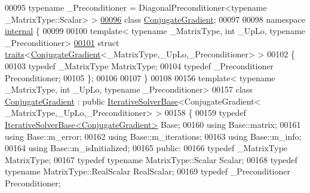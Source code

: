 \begin{DoxyCode}
00095           \textcolor{keyword}{typename} \_Preconditioner = DiagonalPreconditioner<typename \_MatrixType::Scalar> >
\hyperlink{group___iterative_linear_solvers___module}{00096} \textcolor{keyword}{class }\hyperlink{group___iterative_linear_solvers___module_class_eigen_1_1_conjugate_gradient}{ConjugateGradient};
00097 
00098 \textcolor{keyword}{namespace }\hyperlink{namespaceinternal}{internal} \{
00099 
00100 \textcolor{keyword}{template}< \textcolor{keyword}{typename} \_MatrixType, \textcolor{keywordtype}{int} \_UpLo, \textcolor{keyword}{typename} \_Preconditioner>
\hyperlink{struct_eigen_1_1internal_1_1traits_3_01_conjugate_gradient_3_01___matrix_type_00_01___up_lo_00_01___preconditioner_01_4_01_4}{00101} \textcolor{keyword}{struct }\hyperlink{struct_eigen_1_1internal_1_1traits}{traits}<\hyperlink{group___iterative_linear_solvers___module_class_eigen_1_1_conjugate_gradient}{ConjugateGradient}<\_MatrixType,\_UpLo,\_Preconditioner> >
00102 \{
00103   \textcolor{keyword}{typedef} \_MatrixType MatrixType;
00104   \textcolor{keyword}{typedef} \_Preconditioner Preconditioner;
00105 \};
00106 
00107 \}
00108 
00156 \textcolor{keyword}{template}< \textcolor{keyword}{typename} \_MatrixType, \textcolor{keywordtype}{int} \_UpLo, \textcolor{keyword}{typename} \_Preconditioner>
00157 \textcolor{keyword}{class }\hyperlink{group___iterative_linear_solvers___module_class_eigen_1_1_conjugate_gradient}{ConjugateGradient} : \textcolor{keyword}{public} \hyperlink{group___iterative_linear_solvers___module_class_eigen_1_1_iterative_solver_base}{IterativeSolverBase}<ConjugateGradient<
      \_MatrixType,\_UpLo,\_Preconditioner> >
00158 \{
00159   \textcolor{keyword}{typedef} \hyperlink{group___iterative_linear_solvers___module_class_eigen_1_1_iterative_solver_base}{IterativeSolverBase<ConjugateGradient>} Base;
00160   \textcolor{keyword}{using} Base::matrix;
00161   \textcolor{keyword}{using} Base::m\_error;
00162   \textcolor{keyword}{using} Base::m\_iterations;
00163   \textcolor{keyword}{using} Base::m\_info;
00164   \textcolor{keyword}{using} Base::m\_isInitialized;
00165 \textcolor{keyword}{public}:
00166   \textcolor{keyword}{typedef} \_MatrixType MatrixType;
00167   \textcolor{keyword}{typedef} \textcolor{keyword}{typename} MatrixType::Scalar Scalar;
00168   \textcolor{keyword}{typedef} \textcolor{keyword}{typename} MatrixType::RealScalar RealScalar;
00169   \textcolor{keyword}{typedef} \_Preconditioner Preconditioner;

\end{DoxyCode}
